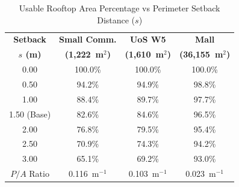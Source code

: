 \begin{table}[t]
\centering
\caption{Usable Rooftop Area Percentage vs Perimeter Setback Distance ($s$)}
\label{tab:sensitivity_setback}
\footnotesize
\setlength{\tabcolsep}{4.5pt}
\begin{tabular}{cccc}
\toprule
\textbf{Setback} & \textbf{Small Comm.} & \textbf{UoS W5} & \textbf{Mall} \\
\textbf{$s$ (m)} & \textbf{(1,222~m$^2$)} & \textbf{(1,610~m$^2$)} & \textbf{(36,155~m$^2$)} \\
\midrule
0.00 & 100.0\% & 100.0\% & 100.0\% \\
0.50 & 94.2\% & 94.9\% & 98.8\% \\
1.00 & 88.4\% & 89.7\% & 97.7\% \\
1.50 (Base) & 82.6\% & 84.6\% & 96.5\% \\
2.00 & 76.8\% & 79.5\% & 95.4\% \\
2.50 & 70.9\% & 74.3\% & 94.2\% \\
3.00 & 65.1\% & 69.2\% & 93.0\% \\
\midrule
$P/A$ Ratio & 0.116~m$^{-1}$ & 0.103~m$^{-1}$ & 0.023~m$^{-1}$ \\
\bottomrule
\end{tabular}
\end{table}
